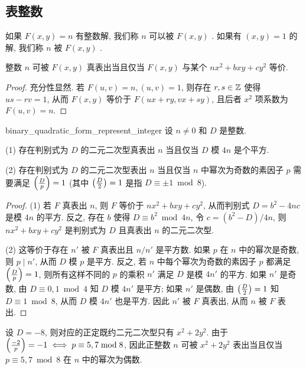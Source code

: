 \subsection{表整数}

\begin{definition}{}{}
如果 $F(x,y)=n$ 有整数解, 我们称 $n$ 可以被 $F(x,y)$ . 如果有 $(x,y)=1$ 的解, 我们称 $n$ 被 $F(x,y)$ .
\end{definition}
\begin{lemma}
整数 $n$ 可被 $F(x,y)$ 真表出当且仅当 $F(x,y)$ 与某个 $nx^2+bxy+cy^2$ 等价.
\end{lemma}
\begin{proof}
充分性显然. 若 $F(u,v)=n,(u,v)=1$, 则存在 $r,s\in{\mathbb{Z}}$ 使得 $us-rv=1$, 从而 $F(x,y)$ 等价于 $F(ux+ry,vx+sy)$, 且后者 $x^2$ 项系数为 $F(u,v)=n$.
\end{proof}

\begin{proposition}{}{binary_quadratic_form_represent_integer}
设 $n\neq 0$ 和 $D$ 是整数. 

(1) 存在判别式为 $D$ 的二元二次型真表出 $n$ 当且仅当 $D$ 模 $4n$ 是个平方.

(2) 存在判别式为 $D$ 的二元二次型表出 $n$ 当且仅当 $n$ 中幂次为奇数的素因子 $p$ 需要满足 $\left(\frac{{D}}{p}\right)=1$ (其中 $\left(\frac{{D}}{2}\right)=1$ 是指 $D\equiv \pm 1\bmod 8$).
\end{proposition}
\begin{proof}
(1) 若 $F$ 真表出 $n$, 则 $F$ 等价于 $nx^2+bxy+cy^2$, 从而判别式 $D=b^2-4nc$ 是模 $4n$ 的平方. 反之, 存在 $b$ 使得 $D\equiv b^2\bmod{4n}$, 令 $c=(b^2-D)/4n$, 则 $nx^2+bxy+cy^2$ 是判别式为 $D$ 且真表出 $n$ 的二元二次型.

(2) 这等价于存在 $n'$ 被 $F$ 真表出且 $n/n'$ 是平方数. 如果 $p$ 在 $n$ 中的幂次是奇数, 则 $p\mid n'$, 从而 $D$ 模 $p$ 是平方. 反之, 若 $n$ 中每个幂次为奇数的素因子 $p$ 都满足 $\left(\frac{{D}}{p}\right)=1$, 则所有这样不同的 $p$ 的乘积 $n'$ 满足 $D$ 是模 $4n'$ 的平方. 如果 $n'$ 是奇数, 由 $D\equiv0,1\bmod4$ 知 $D$ 模 $4n'$ 是平方; 如果 $n'$ 是偶数, 由 $\left(\frac{{D}}{2}\right)=1$ 知 $D\equiv 1\bmod 8$, 从而 $D$ 模 $4n'$ 也是平方. 因此 $n'$ 被 $F$ 真表出, 从而 $n$ 被 $F$ 表出.
\end{proof}

\begin{example}
设 $D=-8$, 则对应的正定既约二元二次型只有 $x^2+2y^2$. 由于 $\left(\frac{{-2}}{p}\right)=-1\iff p\equiv 5,7\bmod8$, 因此正整数 $n$ 可被 $x^2+2y^2$ 表出当且仅当 $p\equiv 5,7\bmod 8$ 在 $n$ 中的幂次为偶数.
\end{example}


